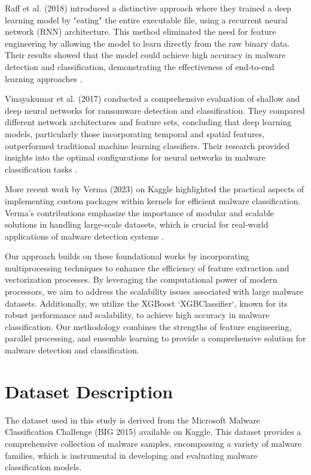 \documentclass[conference]{IEEEtran}
\begin{document}
Raff et al. (2018) introduced a distinctive approach where they trained a deep learning model by "eating" the entire executable file, using a recurrent neural network (RNN) architecture. This method eliminated the need for feature engineering by allowing the model to learn directly from the raw binary data. Their results showed that the model could achieve high accuracy in malware detection and classification, demonstrating the effectiveness of end-to-end learning approaches .

Vinayakumar et al. (2017) conducted a comprehensive evaluation of shallow and deep neural networks for ransomware detection and classification. They compared different network architectures and feature sets, concluding that deep learning models, particularly those incorporating temporal and spatial features, outperformed traditional machine learning classifiers. Their research provided insights into the optimal configurations for neural networks in malware classification tasks .

More recent work by Verma (2023) on Kaggle highlighted the practical aspects of implementing custom packages within kernels for efficient malware classification. Verma's contributions emphasize the importance of modular and scalable solutions in handling large-scale datasets, which is crucial for real-world applications of malware detection systems .

Our approach builds on these foundational works by incorporating multiprocessing techniques to enhance the efficiency of feature extraction and vectorization processes. By leveraging the computational power of modern processors, we aim to address the scalability issues associated with large malware datasets. Additionally, we utilize the XGBoost `XGBClassifier`, known for its robust performance and scalability, to achieve high accuracy in malware classification. Our methodology combines the strengths of feature engineering, parallel processing, and ensemble learning to provide a comprehensive solution for malware detection and classification.

\section{Dataset Description}
The dataset used in this study is derived from the Microsoft Malware Classification Challenge (BIG 2015) available on Kaggle. This dataset provides a comprehensive collection of malware samples, encompassing a variety of malware families, which is instrumental in developing and evaluating malware classification models.
\end{document}

